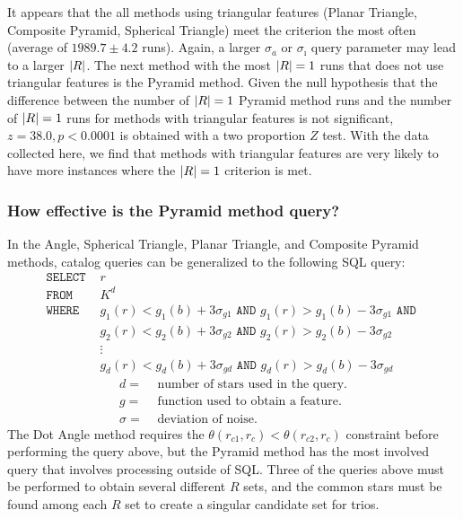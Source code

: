 It appears that the all methods using triangular features (Planar Triangle, Composite Pyramid, Spherical Triangle)
meet the criterion the most often (average of $1989.7 \pm 4.2$ runs).
Again, a larger $\sigma_a$ or $\sigma_\imath$ query parameter may lead to a larger $\left| R \right|$.
The next method with the most $\left| R \right| = 1$ runs that does not use triangular features is the Pyramid method.
Given the null hypothesis that the difference between the number of $\left| R \right| = 1$ Pyramid method runs and the
number of $\left| R \right| = 1$ runs for methods with triangular features is not significant, $z = 38.0, p < 0.0001$ is
obtained with a two proportion $Z$ test.
With the data collected here, we find that methods with triangular features are very likely to have more instances
where the $\left| R \right| = 1$ criterion is met.

\subsubsection{How effective is the Pyramid method query?}
In the Angle, Spherical Triangle, Planar Triangle, and Composite Pyramid methods, catalog queries can be
generalized to the following SQL query:
\begin{align*}
    \texttt{SELECT } &r \\
    \texttt{FROM } &K^d \\
    \texttt{WHERE } &g_1(r) < g_1(b) + 3\sigma_{g1} \texttt{ AND } g_1(r) > g_1(b) - 3\sigma_{g1} \texttt{ AND } \\
    &g_2(r) < g_2(b) + 3\sigma_{g2} \texttt{ AND } g_2(r) > g_2(b) - 3\sigma_{g2} \\
    &\vdots \\
    &g_d(r) < g_d(b) + 3\sigma_{gd} \texttt{ AND } g_d(r) > g_d(b) - 3\sigma_{gd}
\end{align*}
\begin{align*}
    d =& \text{ number of stars used in the query.} \\
    g =& \text{ function used to obtain a feature. } \\
    \sigma =& \text{ deviation of noise. }
\end{align*}
The Dot Angle method requires the $\theta(r_{c1}, r_{c}) < \theta(r_{c2}, r_c)$ constraint before performing the query
above, but the Pyramid method has the most involved query that involves processing outside of SQL\@.
Three of the queries above must be performed to obtain several different $R$ sets, and the common stars must be
found among each $R$ set to create a singular candidate set for trios.

